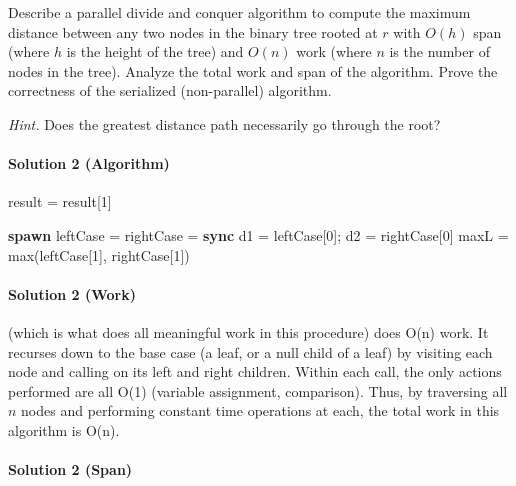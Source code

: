 \documentclass[11pt]{article}
\begin{document}
Describe a parallel divide and conquer algorithm to compute the maximum distance between any two nodes in the binary tree rooted at $r$ with $O(h)$ span (where $h$ is the height of the tree) and $O(n)$ work (where $n$ is the number of nodes in the tree). Analyze the total work and span of the algorithm. Prove the correctness of the serialized (non-parallel) algorithm.

\textit{Hint.} Does the greatest distance path necessarily go through the root?  


\paragraph{Solution 2 (Algorithm)}

\begin{algorithmic}[1]
        \State result = 
        \State \Return result[1]
    \EndProcedure
\end{algorithmic}

\begin{algorithmic}[1]
            \State \Return [0, 0]
        \EndIf
            \State \Return [1, 0]
        \EndIf
        \State \textbf{spawn} leftCase = 
        \State rightCase = 
        \State \textbf{sync}
        \State d1 = leftCase[0]; d2 = rightCase[0]
        \State maxL = max(leftCase[1], rightCase[1])
            \State \Return [max(d1, d2) + 1, d1 + d2]
        \Else
            \State {}
        \EndIf
    \EndProcedure
\end{algorithmic}

\paragraph{Solution 2 (Work)}

 (which is what does all meaningful work in this procedure) does O(n) work. It recurses down to the base case (a leaf, or a null child of a leaf) by visiting each node and calling  on its left and right children. Within each call, the only actions performed are all O(1) (variable assignment, comparison). Thus, by traversing all $n$ nodes and performing constant time operations at each, the total work in this algorithm is O(n).

\paragraph{Solution 2 (Span)}
\end{document}
